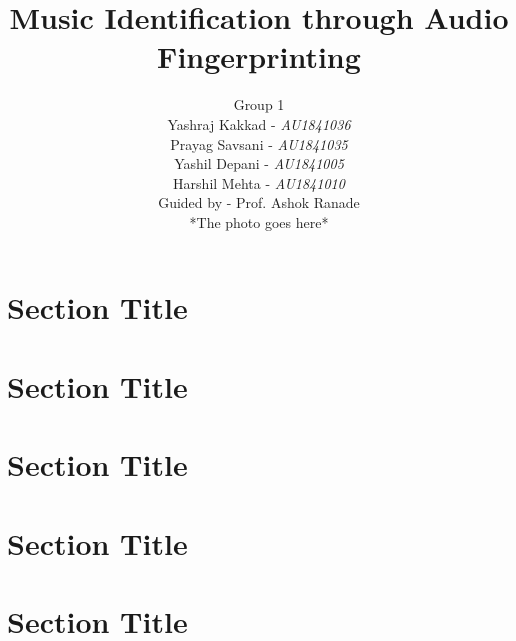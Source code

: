\documentclass[12pt, a4paper]{IEEEtran}
\begin{document}
\title{Music Identification through Audio Fingerprinting}

\author{
    \vspace{10mm}
    \huge
    Group 1 \\
    \vspace{3mm}
    \LARGE
    Yashraj Kakkad - \textit{AU1841036} \\ 
    Prayag Savsani - \textit{AU1841035} \\
    Yashil Depani - \textit{AU1841005} \\ 
    Harshil Mehta - \textit{AU1841010} \\
\vspace{3mm}
Guided by - Prof. Ashok Ranade \\
\null \vfill
*The photo goes here*
}



\section{Section Title}
\blindtext

\section{Section Title}
\blindtext

\section{Section Title}
\blindtext

\section{Section Title}
\blindtext

\section{Section Title}
\blindtext
\end{document}
